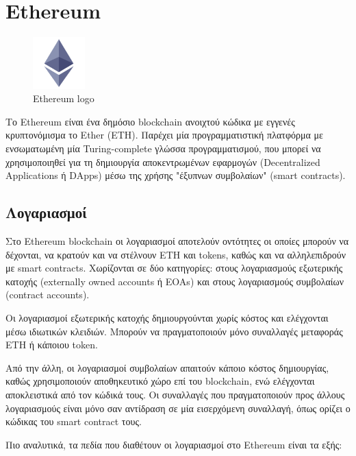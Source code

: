 \section{Ethereum} \label{section:2-6-ethereum}

\begin{figure}[H]
	\centering
	\includegraphics[width=2cm]{assets/figures/ethereum-logo.png}
	\caption{Ethereum logo}
\end{figure}

Το Ethereum είναι ένα δημόσιο blockchain ανοιχτού κώδικα με εγγενές κρυπτονόμισμα το Ether (ETH). Παρέχει μία προγραμματιστική πλατφόρμα με ενσωματωμένη μία Turing-complete γλώσσα προγραμματισμού, που μπορεί να χρησιμοποιηθεί για τη δημιουργία αποκεντρωμένων εφαρμογών (Decentralized Applications ή DApps) μέσω της χρήσης "έξυπνων συμβολαίων" (smart contracts).\cite{2.6-ethereum-whitepaper}

\subsection{Λογαριασμοί} \label{subsection:2-6-1-ethereum-accounts}
Στο Ethereum blockchain οι λογαριασμοί αποτελούν οντότητες οι οποίες μπορούν να δέχονται, να κρατούν και να στέλνουν ETH και tokens, καθώς και να αλληλεπιδρούν με smart contracts.\cite{2.6-ethereum-documentation} Χωρίζονται σε δύο κατηγορίες: στους λογαριασμούς εξωτερικής κατοχής (externally owned accounts ή EOAs) και στους λογαριασμούς συμβολαίων (contract accounts).

Οι λογαριασμοί εξωτερικής κατοχής δημιουργούνται χωρίς κόστος και ελέγχονται μέσω ιδιωτικών κλειδιών. Μπορούν να πραγματοποιούν μόνο συναλλαγές μεταφοράς ETH ή κάποιου token.

Από την άλλη, οι λογαριασμοί συμβολαίων απαιτούν κάποιο κόστος δημιουργίας, καθώς χρησιμοποιούν αποθηκευτικό χώρο επί του blockchain, ενώ ελέγχονται αποκλειστικά από τον κώδικά τους. Οι συναλλαγές που πραγματοποιούν προς άλλους λογαριασμούς είναι μόνο σαν αντίδραση σε μία εισερχόμενη συναλλαγή, όπως ορίζει ο κώδικας του smart contract τους.

Πιο αναλυτικά, τα πεδία που διαθέτουν οι λογαριασμοί στο Ethereum είναι τα εξής:

